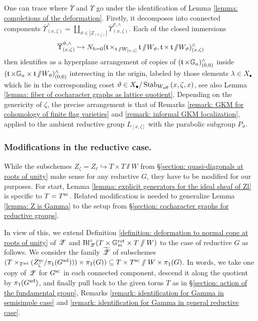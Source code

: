 \begin{remark}\label{remark: Upsilon and GKM}
One can trace where $\overline{\Upsilon}$ and $\Upsilon$ go under the identification of Lemma \ref{lemma: completions of the deformation}. Firstly, it decomposes into connected components $\overline{\Upsilon}^{\wedge}_{(x, \zeta)} = \coprod_{\vartheta \in |Z_{(x, \zeta)}|} \overline{\Upsilon}^{\vartheta, \wedge}_{(x, \zeta)}$. Each of the closed immersions
\begin{equation*}
\overline{\Upsilon}^{\vartheta, \wedge}_{(x, \zeta)} \hookrightarrow N_{h=0}(\t \times_{\t \sslash W_{[x, \zeta]}} \t \sslash W_{\vartheta}, \t \times \t \sslash W_{\vartheta})^{\wedge}_{(x, \zeta)}  
\end{equation*}
then identifies as a hyperplane arrangement of copies of $(\t\times \Ga)^{\wedge}_{(0, 0)}$ inside $(\t \times \Ga \times \t \sslash W_{\vartheta})^{\wedge}_{(0, 0)}$ intersecting in the origin, labeled by those elements $\lambda \in X_{\bullet}$ which lie in the corresponding coset $\vartheta \in X_{\bullet}/\Stab_{W_{\aff}}{(x, \zeta, x)}$, see also Lemma \ref{lemma: fiber of cocharacter graphs as lattice quotient}. Depending on the genericity of $\zeta$, the precise arrangement is that of Remarks \ref{remark: GKM for cohomology of finite flag varieties} and \ref{remark: informal GKM localization}, applied to the ambient reductive group $L_{[x, \zeta]}$ with the parabolic subgroup $P_{\vartheta}$.
\end{remark}



\subsubsection{Modifications in the reductive case.}\label{subsubsection: modifications in the reductive case}
While the subschemes $Z_{\zeta} = Z_{\ell} \hookrightarrow T \times T\sslash W$ from \S \ref{section: quasi-diagonals at roots of unity} make sense for any reductive $G$, they have to be modified for our purposes. For start, Lemma \ref{lemma: explicit generators for the ideal sheaf of Zl} is specific to $T=T^{\sc}$. Related modification is needed to generalize Lemma \ref{lemma: Z is Gamma} to the setup from \S \ref{section: cocharacter graphs for reductive groups}.

In view of this, we extend Definition \ref{definition: deformation to normal cone at roots of unity} of $\eZ$ and $\Bl^{\circ}_{\eZ}(T \times \Gm^{\rot} \times T\sslash W)$ to the case of reductive $G$ as follows. 
We consider the family $\widetilde{\eZ}$ of subschemes $(T \times_{T^{\ad}} (Z^{\sc}_{\zeta}/\pi_1(G^{\ad}))) \times \pi_1(G)) \subseteq T \times T^{\sc} \sslash W \times \pi_1(G)$. In words, we take one copy of $\eZ$ for $G^{\sc}$ in each connected component, descend it along the quotient by $\pi_1(G^{\ad})$, and finally pull back to the given torus $T$ as in \S \ref{section: action of the fundamental group}, Remarks \ref{remark: identification for Gamma in semisimple case} and \ref{remark: identification for Gamma in general reductive case}.

